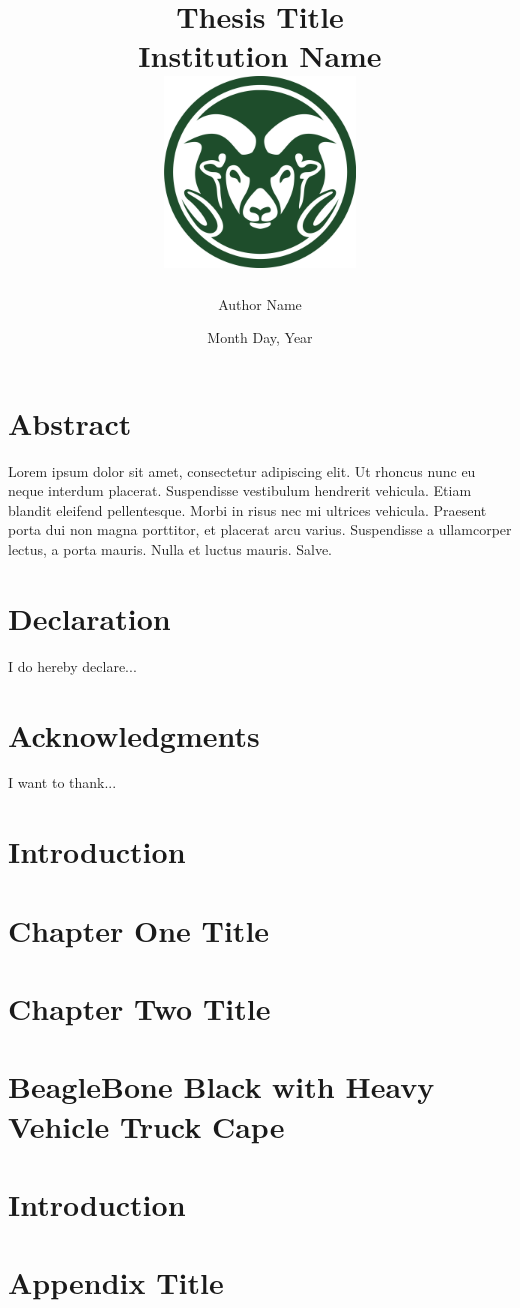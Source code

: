 \documentclass[11pt,twoside]{report}
\title{
	{Thesis Title}\\
	{\large Institution Name}\\
	{\includegraphics[width=2in]{chapter01/universitylogo.png}}
}
\author{Author Name}
\date{Month Day, Year}
\begin{document}
\maketitle
\chapter*{Abstract}
Lorem ipsum dolor sit amet, consectetur adipiscing elit. Ut rhoncus nunc eu neque interdum placerat. Suspendisse vestibulum hendrerit vehicula. Etiam blandit eleifend pellentesque. Morbi in risus nec mi ultrices vehicula. Praesent porta dui non magna porttitor, et placerat arcu varius. Suspendisse a ullamcorper lectus, a porta mauris. Nulla et luctus mauris. Salve.

\chapter*{Declaration}
I do hereby declare...

\chapter*{Acknowledgments}
I want to thank...

\tableofcontents

\chapter{Introduction}


\chapter{Chapter One Title}


\chapter{Chapter Two Title}


\chapter{BeagleBone Black with Heavy Vehicle Truck Cape}


\chapter{Introduction}


\appendix
\chapter{Appendix Title}

\end{document}
